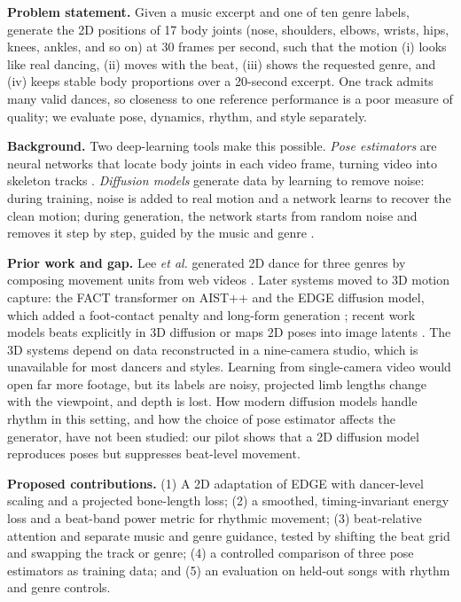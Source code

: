 \documentclass[conference,letterpaper]{IEEEtran}
\begin{document}
\textbf{Problem statement.} Given a music excerpt and one of ten genre labels, generate the 2D positions of 17 body joints (nose, shoulders, elbows, wrists, hips, knees, ankles, and so on) at 30 frames per second, such that the motion (i) looks like real dancing, (ii) moves with the beat, (iii) shows the requested genre, and (iv) keeps stable body proportions over a 20-second excerpt. One track admits many valid dances, so closeness to one reference performance is a poor measure of quality; we evaluate pose, dynamics, rhythm, and style separately.

\textbf{Background.} Two deep-learning tools make this possible. \emph{Pose estimators} are neural networks that locate body joints in each video frame, turning video into skeleton tracks \cite{yang2023,cao2021,bazarevsky2020}. \emph{Diffusion models} generate data by learning to remove noise: during training, noise is added to real motion and a network learns to recover the clean motion; during generation, the network starts from random noise and removes it step by step, guided by the music and genre \cite{song2021}.

\textbf{Prior work and gap.} Lee \emph{et al.} generated 2D dance for three genres by composing movement units from web videos \cite{lee2019}. Later systems moved to 3D motion capture: the FACT transformer on AIST++ \cite{li2021} and the EDGE diffusion model, which added a foot-contact penalty and long-form generation \cite{tseng2023}; recent work models beats explicitly in 3D diffusion \cite{gao2026} or maps 2D poses into image latents \cite{dancedit}. The 3D systems depend on data reconstructed in a nine-camera studio, which is unavailable for most dancers and styles. Learning from single-camera video would open far more footage, but its labels are noisy, projected limb lengths change with the viewpoint, and depth is lost. How modern diffusion models handle rhythm in this setting, and how the choice of pose estimator affects the generator, have not been studied: our pilot shows that a 2D diffusion model reproduces poses but suppresses beat-level movement.

\textbf{Proposed contributions.} (1) A 2D adaptation of EDGE with dancer-level scaling and a projected bone-length loss; (2) a smoothed, timing-invariant energy loss and a beat-band power metric for rhythmic movement; (3) beat-relative attention and separate music and genre guidance, tested by shifting the beat grid and swapping the track or genre; (4) a controlled comparison of three pose estimators as training data; and (5) an evaluation on held-out songs with rhythm and genre controls.
\end{document}
